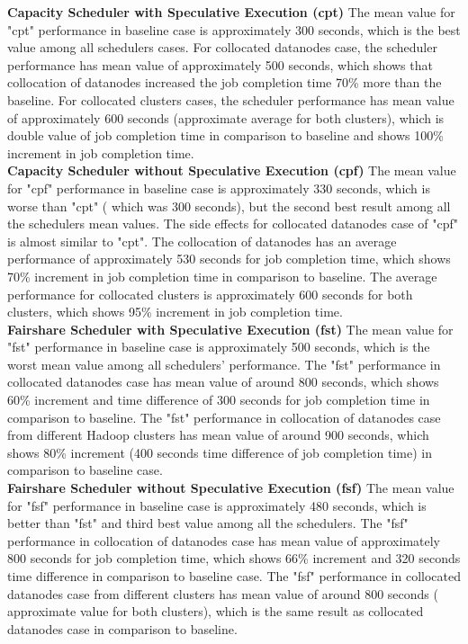 \textbf{Capacity Scheduler with Speculative Execution (cpt)} The mean value for "cpt" performance in baseline case is approximately 300 seconds, which is the best value among all schedulers cases. For collocated datanodes case, the scheduler performance has mean value of approximately 500 seconds, which shows that collocation of datanodes increased the job completion time 70\% more than the baseline. For collocated clusters cases, the scheduler performance has mean value of approximately 600 seconds (approximate average for both clusters), which is double value of job completion time in comparison to baseline and shows 100\% increment in job completion time.\\

\textbf{Capacity Scheduler without Speculative Execution (cpf)}  The mean value for "cpf" performance  in baseline case is approximately 330 seconds, which is worse than "cpt" ( which was 300 seconds), but the second best result among all the schedulers mean values. The side effects for collocated datanodes case of "cpf" is almost similar to "cpt". The collocation of datanodes has an average performance of approximately 530 seconds for job completion time, which shows 70\% increment in job completion time in comparison to baseline. The average performance for collocated clusters is approximately 600 seconds for both clusters, which shows 95\% increment in job completion time. \\


\textbf{Fairshare Scheduler with Speculative Execution (fst)} The mean value for "fst" performance in  baseline case is approximately 500 seconds, which is the worst mean value among all schedulers' performance. The "fst" performance in collocated datanodes case has mean value of around 800 seconds, which shows 60\% increment and time difference of 300 seconds for job completion time in comparison to baseline. The "fst" performance in collocation of datanodes case from different Hadoop clusters has mean value of around 900 seconds, which shows 80\% increment (400 seconds time difference of job completion time) in comparison to baseline case.\\

\textbf{Fairshare Scheduler without Speculative Execution (fsf) } The  mean value for "fsf" performance  in baseline case is approximately 480 seconds, which is better than "fst" and third best value among all the schedulers. The "fsf" performance in collocation of datanodes case has mean value of approximately 800 seconds for job completion time, which shows 66\% increment and 320 seconds time difference in comparison to baseline case. The "fsf" performance in collocated datanodes case from different clusters  has mean value of around 800 seconds ( approximate value for both clusters), which is the same result as collocated datanodes case in comparison to baseline. \\


